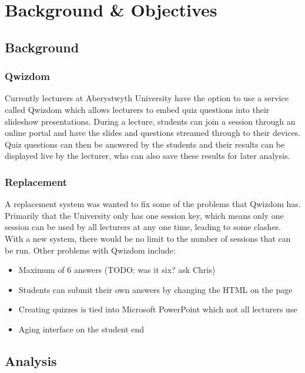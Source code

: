 \chapter{Background \& Objectives}
\section{Background} 
\subsection{Qwizdom}
Currently lecturers at Aberystwyth University have the option to use a service called Qwizdom\cite{Qwizdom} which allows lecturers to embed quiz questions into their slideshow presentations. During a lecture, students can join a session through an online portal and have the slides and questions streamed through to their devices. Quiz questions can then be answered by the students and their results can be displayed live by the lecturer, who can also save these results for later analysis.

\subsection{Replacement}
A replacement system was wanted to fix some of the problems that Qwizdom has. Primarily that the University only has one session key, which means only one session can be used by all lecturers at any one time, leading to some clashes. With a new system, there would be no limit to the number of sessions that can be run. Other problems with Qwizdom include:
\begin{itemize}
	\item Maximum of 6 answers (TODO: was it six? ask Chris)
	\item Students can submit their own answers by changing the HTML on the page
	\item Creating quizzes is tied into Microsoft PowerPoint which not all lecturers use
	\item Aging interface on the student end
\end{itemize}

\section{Analysis}

